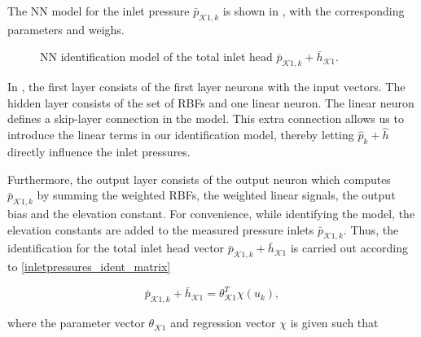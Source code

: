 The NN model for the inlet pressure $\bar{p}_{\mathcal{K}1,k}$ is shown in , with the corresponding  parameters and weighs.

 \begin{figure}[H]
 \centering
  
  \vspace{-7mm}
 \caption{NN identification model of the total inlet head $\bar{p}_{\mathcal{K}1,k} + \bar{h}_{\mathcal{K}1}$.}
 \label{fig:nn_output}
 \end{figure}

 \vspace{-3mm}

 In , the first layer consists of the first layer neurons with the input vectors. The hidden layer consists of the set of RBFs and one linear neuron. The linear neuron defines a skip-layer connection in the model. This extra connection allows us to introduce the linear terms in our identification model, thereby letting  $\hat{p}_{k} \!+\! \hat{h}$ directly influence the inlet pressures. 

 Furthermore, the output layer consists of the output neuron which computes $\bar{p}_{\mathcal{K}1,k}$ by summing the weighted RBFs, the weighted linear signals, the output bias and the elevation constant. For convenience, while identifying the model, the elevation constants are added to the measured pressure inlets $\bar{p}_{\mathcal{K}1,k}$. Thus, the identification for the total inlet head vector $\bar{p}_{\mathcal{K1},k} \! + \! \bar{h}_{\mathcal{K1}} $ is carried out according to \eqref{inletpressures_ident_matrix}

  \begin{equation}
\label{inletpressures_ident_matrix}
\bar{p}_{\mathcal{K}1,k} + \bar{h}_{\mathcal{K}1} = \theta^T_{\mathcal{K}1} \chi(u_k),
\end{equation}

where the parameter vector $\theta_{\mathcal{K}1}$ and regression vector $\chi$ is given such that


